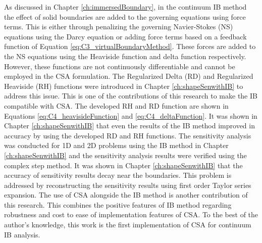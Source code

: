 As discussed in Chapter \ref{ch:immersedBoundary}, in the continuum IB method the effect of solid boundaries are added to the governing equations using force terms. This is either through penalizing the governing Navier-Stokes (NS) equations using the Darcy equation or adding force terms based on a feedback function of Equation \eqref{eq:C3_virtualBoundaryMethod}. These forces are added to the NS equations using the Heaviside function and delta function respectively. However, these functions are not continuously differentiable and cannot be employed in the CSA formulation. The Regularized Delta (RD) and Regularized Heaviside (RH) functions were introduced in Chapter \ref{ch:shapeSenwithIB} to address this issue. This is one of the contributions of this research to make the IB compatible with CSA. The developed RH and RD function are shown in Equations \eqref{eq:C4_heavisideFunction} and \eqref{eq:C4_deltaFunction}. It was shown in Chapter \ref{ch:shapeSenwithIB} that even the results of the IB method improved in accuracy by using the developed RD and RH functions. The sensitivity analysis was conducted for 1D and 2D problems using the IB method in Chapter \ref{ch:shapeSenwithIB} and the sensitivity analysis results were verified using the complex step method. It was shown in Chapter \ref{ch:shapeSenwithIB} that the accuracy of sensitivity results decay near the boundaries. This problem is addressed by reconstructing the sensitivity results using first order Taylor series expansion. The use of CSA alongside the IB method is another contribution of this research. This combines the positive features of IB method regarding robustness and cost to ease of implementation features of CSA. To the best of the author's knowledge, this work is the first implementation of CSA for continuum IB analysis.
